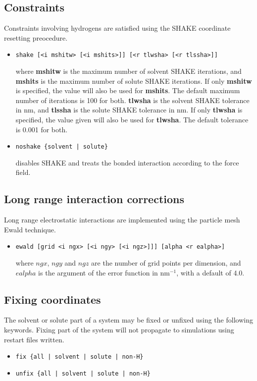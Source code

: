 \subsection{Constraints}
Constraints involving hydrogens are satisfied using the SHAKE 
coordinate resetting preocedure.
\begin{itemize}
\item
\begin{verbatim}
shake [<i mshitw> [<i mshits>]] [<r tlwsha> [<r tlssha>]]
\end{verbatim}
where {\bf mshitw} is the maximum number of solvent SHAKE iterations,
and {\bf mshits} is the maximum number of solute SHAKE iterations. If
only {\bf mshitw} is specified, the value will also be used for {\bf mshits}.
The default maximum number of iterations is 100 for both.
{\bf tlwsha} is the solvent SHAKE tolerance in nm, and {\bf tlssha} is
the solute SHAKE tolerance in nm. If only {\bf tlwsha} is specified, the
value given will also be used for {\bf tlwsha}. The default tolerance
is 0.001 for both.
\item
\begin{verbatim}
noshake {solvent | solute}
\end{verbatim}
disables SHAKE and treats the bonded interaction according to the
force field.
\end{itemize}
\subsection{Long range interaction corrections}
Long range electrostatic interactions are implemented using the
particle mesh Ewald technique.
\begin{itemize}
\item
\begin{verbatim}
ewald [grid <i ngx> [<i ngy> [<i ngz>]]] [alpha <r ealpha>]
\end{verbatim}
where $ngx$, $ngy$ and $ngz$ are the number of grid points per
dimension, and $ealpha$ is the argument of the error function in
nm$^{-1}$, with a default of 4.0.
\end{itemize}
\subsection{Fixing coordinates}
The solvent or solute part of a system may be fixed or unfixed using
the following keywords. Fixing part of the system will not propagate to
simulations using restart files written.
\begin{itemize}
\item
\begin{verbatim}
fix {all | solvent | solute | non-H}
\end{verbatim}
\item
\begin{verbatim}
unfix {all | solvent | solute | non-H}
\end{verbatim}
\end{itemize}
